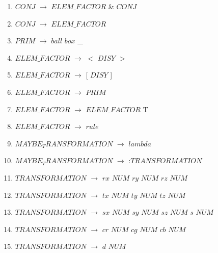 \begin{enumerate}
\item $CONJ$   	$\rightarrow$  $ELEM\_FACTOR$ \& $CONJ$ \\
\item $CONJ$   	$\rightarrow$  $ELEM\_FACTOR$ \\

\item $PRIM$	$\rightarrow$	$ball$ \textbar $box$ \textbar \_ \\
\item $ELEM\_FACTOR$   	$\rightarrow$  $<$ $DISY$ $>$ \\
\item $ELEM\_FACTOR$   	$\rightarrow$  [ $DISY$ ] \\
\item $ELEM\_FACTOR$   	$\rightarrow$  $PRIM$ \\
\item $ELEM\_FACTOR$ 	$\rightarrow$  $ELEM\_FACTOR$ T \\
\item $ELEM\_FACTOR$ 	$\rightarrow$  $rule$ \\


\item $MAYBE_TRANSFORMATION$   $\rightarrow$  $lambda$ \\
\item $MAYBE_TRANSFORMATION$   $\rightarrow$  :$TRANSFORMATION$ \\

\item $TRANSFORMATION$  $\rightarrow$   $rx$ $NUM$ \textbar $ry$ $NUM$ \textbar $rz$ $NUM$ \\
\item $TRANSFORMATION$	$\rightarrow$	$tx$ $NUM$ \textbar $ty$ $NUM$ \textbar $tz$ $NUM$ \\
\item $TRANSFORMATION$	$\rightarrow$	$sx$ $NUM$ \textbar $sy$ $NUM$ \textbar $sz$ $NUM$ \textbar $s$ $NUM$ \\
\item $TRANSFORMATION$ 	$\rightarrow$	$cr$ $NUM$ \textbar $cg$ $NUM$ \textbar $cb$ $NUM$ \\
\item $TRANSFORMATION$	$\rightarrow$	$d$  $NUM$ \\



\end{enumerate}

\noindent
